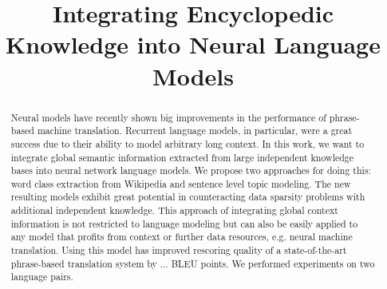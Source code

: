 \documentclass[a4paper]{article}
\title{Integrating Encyclopedic Knowledge into Neural Language Models}
\begin{document}
\maketitle
%
\begin{abstract}
Neural models have recently shown big improvements in the performance of phrase-based machine translation. Recurrent language models, in particular, were a great success due to their ability to model arbitrary long context. In this work, we want to integrate global semantic information extracted from large independent knowledge bases into neural network language models. We propose two approaches for doing this: word class extraction from Wikipedia and sentence level topic modeling. 
The new resulting models exhibit great potential in counteracting data sparsity problems with additional independent knowledge. This approach of integrating global context information is not restricted to language modeling but can also be easily applied to any model that profits from context or further data resources, e.g. neural machine translation. Using this model has improved rescoring quality of a state-of-the-art phrase-based translation system by ... BLEU points.  We performed experiments on two language pairs.



\end{abstract}


%
\end{document}
